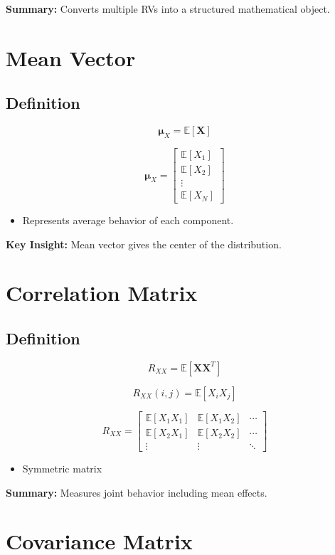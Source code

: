 \documentclass[12pt]{article}
\begin{document}
\textbf{Summary:} Converts multiple RVs into a structured mathematical object.

\section{Mean Vector}
\subsection{Definition}
\[
\bm{\mu}_X = \mathbb{E}[\mathbf{X}]
\]

\[
\bm{\mu}_X =
\begin{bmatrix}
\mathbb{E}[X_1] \\
\mathbb{E}[X_2] \\
\vdots \\
\mathbb{E}[X_N]
\end{bmatrix}
\]

\begin{itemize}
    \item Represents average behavior of each component.
\end{itemize}

\textbf{Key Insight:} Mean vector gives the center of the distribution.

\section{Correlation Matrix}
\subsection{Definition}
\[
R_{XX} = \mathbb{E}[\mathbf{X}\mathbf{X}^T]
\]

\[
R_{XX}(i,j) = \mathbb{E}[X_i X_j]
\]

\[
R_{XX} =
\begin{bmatrix}
\mathbb{E}[X_1X_1] & \mathbb{E}[X_1X_2] & \cdots \\
\mathbb{E}[X_2X_1] & \mathbb{E}[X_2X_2] & \cdots \\
\vdots & \vdots & \ddots
\end{bmatrix}
\]

\begin{itemize}
    \item Symmetric matrix
\end{itemize}

\textbf{Summary:} Measures joint behavior including mean effects.

\section{Covariance Matrix}
\end{document}
